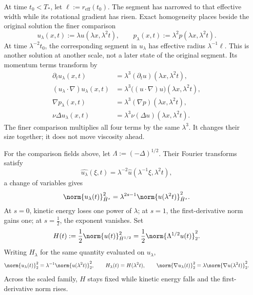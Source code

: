 
At time \(t_0<T_*\), let \(\ell:=r_{\mathrm{eff}}(t_0)\). The segment has narrowed to that effective width while its rotational gradient has risen. Exact \NavierStokes{} homogeneity places beside the original solution the finer comparison
\[
  u_\lambda(x,t)
  :=
  \lambda u(\lambda x,\lambda^2t),
  \qquad
  p_\lambda(x,t)
  :=
  \lambda^2p(\lambda x,\lambda^2t).
\]
At time \(\lambda^{-2}t_0\), the corresponding segment in \(u_\lambda\) has effective radius \(\lambda^{-1}\ell\). This is another solution at another scale, not a later state of the original segment. Its momentum terms transform by
\[
\begin{aligned}
  \partial_tu_\lambda(x,t)
  &=
  \lambda^3(\partial_tu)(\lambda x,\lambda^2t),
  \\
  (u_\lambda\cdot\nabla)u_\lambda(x,t)
  &=
  \lambda^3\bigl((u\cdot\nabla)u\bigr)(\lambda x,\lambda^2t),
  \\
  \nabla p_\lambda(x,t)
  &=
  \lambda^3(\nabla p)(\lambda x,\lambda^2t),
  \\
  \nu\Delta u_\lambda(x,t)
  &=
  \lambda^3\nu(\Delta u)(\lambda x,\lambda^2t).
\end{aligned}
\]
The finer comparison multiplies all four terms by the same \(\lambda^3\). It changes their size together; it does not move viscosity ahead.


For the comparison fields above, let \(\Lambda:=(-\Delta)^{1/2}\). Their Fourier transforms satisfy
\[
  \widehat{u_\lambda}(\xi,t)
  =
  \lambda^{-2}\widehat u(\lambda^{-1}\xi,\lambda^2t),
\]
a change of variables gives
\[
  \norm{u_\lambda(t)}_{\dot H^s}^2
  =
  \lambda^{2s-1}
  \norm{u(\lambda^2t)}_{\dot H^s}^2.
\]
At \(s=0\), kinetic energy loses one power of \(\lambda\); at \(s=1\), the first-derivative norm gains one; at \(s=\tfrac12\), the exponent vanishes. Set
\[
  H(t)
  :=
  \frac12\norm{u(t)}_{\dot H^{1/2}}^2
  =
  \frac12\norm{\Lambda^{1/2}u(t)}_2^2.
\]
Writing \(H_\lambda\) for the same quantity evaluated on \(u_\lambda\),
\[
  \norm{u_\lambda(t)}_2^2
  =
  \lambda^{-1}\norm{u(\lambda^2t)}_2^2,
  \qquad
  H_\lambda(t)=H(\lambda^2t),
  \qquad
  \norm{\nabla u_\lambda(t)}_2^2
  =
  \lambda\norm{\nabla u(\lambda^2t)}_2^2.
\]
Across the scaled family, \(H\) stays fixed while kinetic energy falls and the first-derivative norm rises.


